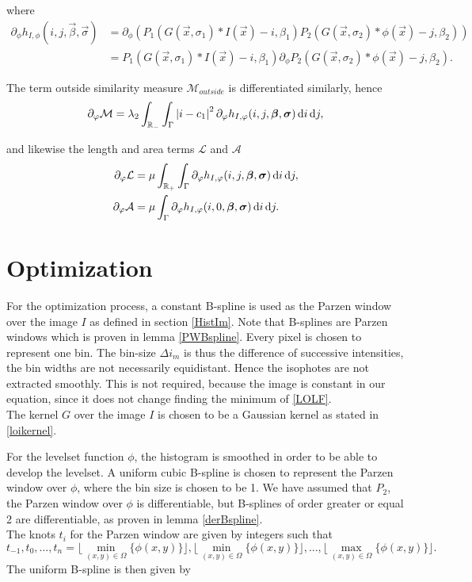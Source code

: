 where
\begin{equation}
  \begin{split}
    \partial_\phi h_{I,\phi}(i,j,\vec{\beta},\vec{\sigma}) &= \partial_\phi \left(P_1(G(\vec{x},\sigma_1)*I(\vec{x})-i,\beta_1)P_2(G(\vec{x},\sigma_2)*\phi(\vec{x})-j,\beta_2)\right)\\ 
    &= P_1(G(\vec{x},\sigma_1)*I(\vec{x})-i,\beta_1)\partial_\phi P_2(G(\vec{x},\sigma_2)*\phi(\vec{x})-j,\beta_2).
  \end{split}
\end{equation}

The term outside similarity measure $\mathcal{M}_{outside}$ is differentiated similarly, hence
\begin{equation}
\partial_\varphi \mathcal{M} = \lambda_2\int_{\mathbb R_-} \int_{\Gamma} \left| {i-c_1} \right|^2 \partial_\varphi h_{I,\varphi}(i,j,\boldsymbol{\beta} ,\boldsymbol{\sigma} )\,{\rm d} i\,{\rm d} j,
\end{equation}

and likewise the length and area terms $\mathcal{L}$ and $\mathcal{A}$
\begin{align}
  \partial_\varphi \mathcal{L} &= \mu \int_{\mathbb R_+} \int_{\Gamma} \partial_\varphi h_{I,\varphi}(i,j,\boldsymbol{\beta} ,\boldsymbol{\sigma} )\,{\rm d} i\,{\rm d} j,\\
  \partial_\varphi \mathcal{A} &= \mu  \int_{\Gamma} \partial_\varphi h_{I,\varphi}(i,0,\boldsymbol{\beta} ,\boldsymbol{\sigma} )\,{\rm d} i\,{\rm d} j.
\end{align}

\section{Optimization}\label{section:OLopt}
For the optimization process, a constant B-spline is used as the Parzen window over the image $I$ as defined in section \ref{HistIm}. Note that B-splines are Parzen windows which is proven in lemma \eqref{PWBspline}. Every pixel is chosen to represent one bin. The bin-size $\Delta i_m$ is thus the difference of successive intensities, the bin widths are not necessarily equidistant. Hence the isophotes are not extracted smoothly. This is not required, because the image is constant in our equation, since it does not change finding the minimum of \eqref{LOLF}.\\
The kernel $G$ over the image $I$ is chosen to be a Gaussian kernel as stated in \eqref{loikernel}. 

For the levelset function $\phi$, the histogram is smoothed in order to be able to develop the levelset. A uniform cubic B-spline is chosen to represent the Parzen window over $\phi$, where the bin size is chosen to be 1. We have assumed that $P_2$, the Parzen window over $\phi$ is differentiable, but B-splines of order greater or equal 2 are differentiable, as proven in lemma \eqref{derBspline}.\\
The knots $t_i$ for the Parzen window are given by integers such that
\[
t_{-1},t_0,\dots,t_n = \lfloor\min_{(x,y)\in\Omega}\{\phi(x,y)\}\rfloor, \lfloor\min_{(x,y)\in\Omega}\{\phi(x,y)\}\rfloor, \dots, \lfloor\max_{(x,y)\in\Omega}\{\phi(x,y)\}\rfloor.
\]
The uniform B-spline is then given by

